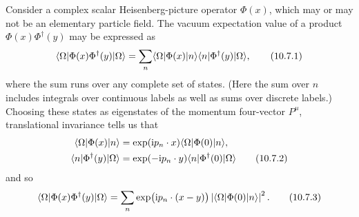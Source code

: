 Consider a complex scalar Heisenberg-picture operator $\Phi(x)$, which
may or may not be an elementary particle field. The vacuum expectation
value of a product $\Phi(x)\Phi^\dagger(y)$ may be expressed as
\begin{equation}
  \langle \Omega\rvert\Phi(x)\Phi^\dagger(y)\lvert \Omega\rangle
  =\sum_n\langle \Omega\rvert\Phi(x)\lvert n\rangle
  \langle n\rvert\Phi^\dagger(y)\lvert \Omega\rangle,
  \tag{10.7.1}\label{eq:10.7.1}
\end{equation}
where the sum runs over any complete set of states. (Here the sum over
$n$ includes integrals over continuous labels as well as sums over discrete
labels.) Choosing these states as eigenstates of the momentum four-vector
$P^\mu$, translational invariance tells us that
\begin{align}
  \langle \Omega\rvert\Phi(x)\lvert n\rangle
  &=\exp(\mathrm{i} p_n\cdot x)\langle \Omega\rvert\Phi(0)\lvert n\rangle,\notag\\
  \langle n\rvert\Phi^\dagger(y)\lvert \Omega\rangle
  &=\exp(-\mathrm{i} p_n\cdot y)\langle n\rvert\Phi^\dagger(0)\lvert \Omega\rangle
  \tag{10.7.2}\label{eq:10.7.2}
\end{align}
and so
\begin{equation}
  \langle \Omega\rvert\Phi(x)\Phi^\dagger(y)\lvert \Omega\rangle
  =\sum_n\exp\bigl(\mathrm{i} p_n\cdot(x-y)\bigr)
  \left|\langle \Omega\rvert\Phi(0)\lvert n\rangle\right|^2.
  \tag{10.7.3}\label{eq:10.7.3}
\end{equation}

